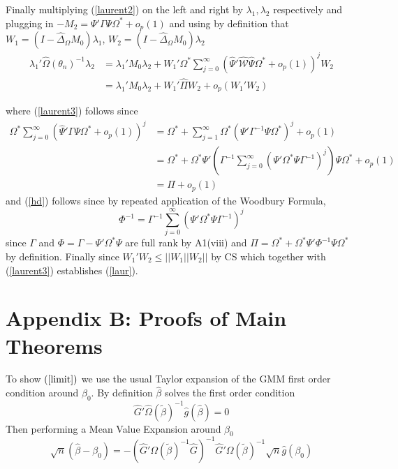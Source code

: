 \documentclass[11pt, fleqn]{article}
\begin{document}
 Finally multiplying (\ref{laurent2}) on the left and right by $\lambda_1, \lambda_2$ respectively and plugging in  $-M_2=\Psi'\Gamma\Psi\Omega^* +o_p(1)$  and using by definition that
 $W_1=(I-\hat{\Delta}_{\Omega}M_0)\lambda_1$, $W_2=(I-\hat{\Delta}_{\Omega}M_0)\lambda_2$
 \begin{align} \lambda_1'\hat{\Omega}(\theta_n)^{-1}\lambda_2 &= \lambda_1'M_0\lambda_2 +W_1'\Omega^*\sum_{j=0}^\infty (\hat{\Psi}'\hat{\mathcal{W}}\hat{\Psi}\Omega^*+o_p(1))^j W_2\\
 \label{laurent3} &=\lambda_1'M_0\lambda_2 +W_1'\hat{\Pi} W_2+ o_p(W_1'W_2)\end{align}
 
 where (\ref{laurent3}) follows since
 \begin{align}\Omega^*\sum_{j=0}^\infty (\hat{\Psi}'\Gamma\Psi\Omega^*+o_p(1))^j&=\Omega^*+\sum_{j=1}^\infty \Omega^*(\Psi'\Gamma^{-1}\Psi\Omega^*)^j+o_p(1)\\
 \label{had} &=\Omega^*+ \Omega^*\Psi'\left(\Gamma^{-1}\sum_{j=0}^\infty(\Psi'\Omega^*\Psi\Gamma^{-1})^j\right)\Psi\Omega^*+o_p(1)\\
 \label{hd} &=\Pi+o_p(1)
 \end{align}
 and (\ref{hd}) follows since by repeated application of the Woodbury Formula,
 \begin{equation} \label{wood} \Phi^{-1}=\Gamma^{-1}\sum_{j=0}^\infty(\Psi'\Omega^*\Psi\Gamma^{-1})^j\end{equation}
 since $\Gamma$ and $\Phi=\Gamma-\Psi'\Omega^*\Psi$ are full rank by A1(viii) and $\Pi=\Omega^*+ \Omega^*\Psi'\Phi^{-1}\Psi\Omega^*$ by definition. Finally since $W_1'W_2\leq |\!|W_1|\!|W_2|\!|$ by CS which together with (\ref{laurent3}) establishes (\ref{laur}).\\
 









\section*{Appendix B: Proofs of Main Theorems}



 To show $(\ref{limit})$ we use the usual Taylor expansion  of the GMM first order condition around $\beta_0$. By definition $\hat{\beta}$ solves the first order condition
  \begin{equation} \hat{G}'\hat \Omega(\tilde{\beta})^{-1}\hat{g}(\hat{\beta})=0\end{equation}
  Then performing a Mean Value Expansion around $\beta_0$
  \begin{equation} \label{bexpan}\sqrt{n}(\hat{\beta}-\beta_0)=-(\hat{G}'\Omega(\tilde{\beta})^{-1}\hat{G})^{-1}
  \hat{G}'\Omega(\tilde{\beta})^{-1}\sqrt{n}\hat{g}(\beta_0)\end{equation}
\end{document}
